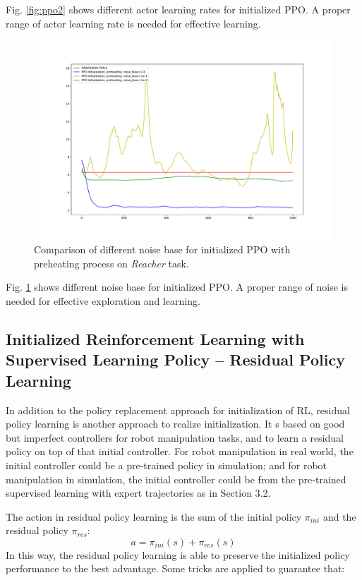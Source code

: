 \documentclass{article}
\begin{document}
Fig. \ref{fig:ppo2} shows different actor learning rates for initialized PPO. A proper range of actor learning rate is needed for effective learning.

\begin{figure}[htbp]
	\centering
	\includegraphics[scale=0.4]{img/ppo_compare4.pdf}
	\caption{Comparison of different noise base for initialized PPO with preheating process on \textit{Reacher} task.}
	\label{fig:ppo3}
\end{figure}

Fig. \ref{fig:ppo3} shows different noise base for initialized PPO. A proper range of noise is needed for effective exploration and learning.


\subsection{Initialized Reinforcement Learning with Supervised Learning Policy -- Residual Policy Learning}
In addition to the policy replacement approach for initialization of RL, residual policy learning \cite{johannink2018residual} is another approach to realize initialization. It s based on good but imperfect controllers for robot manipulation tasks, and to learn a residual policy on top of that initial controller. For robot manipulation in real world, the initial controller could be a pre-trained policy in simulation; and for robot manipulation in simulation, the initial controller could be from the pre-trained supervised learning with expert trajectories as in Section 3.2.

The action in residual policy learning is the sum of the initial policy $\pi_{ini}$ and the residual policy $\pi_{res}$:
\begin{equation}
a=\pi_{ini}(s)+\pi_{res}(s)
\end{equation}
In this way, the residual policy learning is able to preserve the initialized policy performance to the best advantage. Some tricks are applied to guarantee that: 
\end{document}
